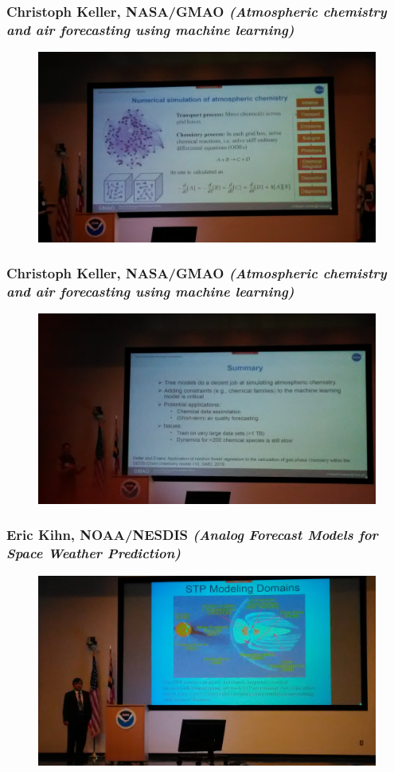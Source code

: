\documentclass{beamer}
\begin{document}
\begin{frame}
\frametitle{Christoph Keller, NASA/GMAO \textit{(Atmospheric chemistry and air forecasting using machine learning)}}
\begin{figure}
	\includegraphics[width=.9\linewidth]{figs/P_20190425_085723.jpg}
\end{figure}
\end{frame}


\begin{frame}
\frametitle{Christoph Keller, NASA/GMAO \textit{(Atmospheric chemistry and air forecasting using machine learning)}}
\begin{figure}
	\includegraphics[width=.9\linewidth]{figs/P_20190425_090846.jpg}
\end{figure}
\end{frame}


\begin{frame}
\frametitle{Eric Kihn, NOAA/NESDIS \textit{(Analog Forecast Models for Space Weather Prediction)}}
\begin{figure}
	\includegraphics[width=.9\linewidth]{figs/P_20190425_093405.jpg}
\end{figure}
\end{frame}
\end{document}
